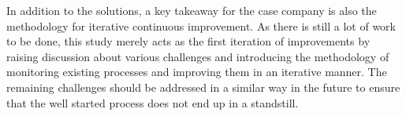 In addition to the solutions, a key takeaway for the case company is also the methodology for iterative continuous improvement. As there is still a lot of work to be done, this study merely acts as the first
iteration of improvements by raising discussion about various challenges and introducing the methodology of monitoring existing processes and improving them in an iterative manner.
The remaining challenges should be addressed in a similar way in the future to ensure that the well started process does not end up in a standstill.
